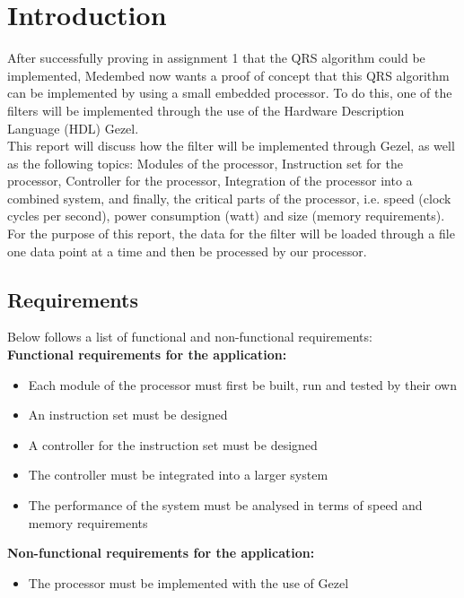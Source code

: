 \documentclass[12pt,a4paper]{article}
\begin{document}
\section{Introduction}
	After successfully proving in assignment 1 that the QRS algorithm could be implemented, Medembed now wants a proof of concept that this QRS algorithm can be implemented by using a small embedded processor. To do this, one of the filters will be implemented through the use of the Hardware Description Language (HDL) Gezel.\\
	This report will discuss how the filter will be implemented through Gezel, as well as the following topics: Modules of the processor, Instruction set for the processor, Controller for the processor, Integration of the processor into a combined system, and finally, the critical parts of the processor, i.e. speed (clock cycles per second), power consumption (watt) and size (memory requirements).\\
	For the purpose of this report, the data for the filter will be loaded through a file one data point at a time and then be processed by our processor.\\
	
\subsection{Requirements}
Below follows a list of functional and non-functional requirements:\\

\textbf{ Functional requirements for the application:}
\begin{itemize}
	\item Each module of the processor must first be built, run and tested by their own
	\item An instruction set must be designed
	\item A controller for the instruction set must be designed
	\item The controller must be integrated into a larger system
	\item The performance of the system must be analysed in terms of speed and memory requirements

\end{itemize}
\textbf{Non-functional requirements for the application:}
\begin {itemize}
	\item The processor must be implemented with the use of Gezel
\end{itemize}
\end{document}
